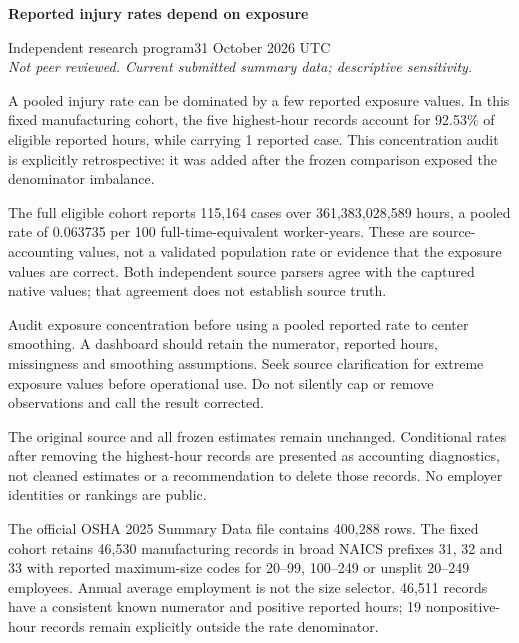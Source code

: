 \documentclass[11pt,letterpaper]{article}
\newcommand{\heading}[1]{\vspace{4pt}{\large\bfseries #1}\par}
\newcommand{\BoundA}{92.53}
\newcommand{\BoundB}{1}
\newcommand{\BoundC}{115,164}
\newcommand{\BoundD}{361,383,028,589}
\newcommand{\BoundE}{0.063735}
\newcommand{\BoundF}{400,288}
\newcommand{\BoundG}{46,530}
\newcommand{\BoundH}{46,511}
\newcommand{\BoundI}{19}
\begin{document}
{\LARGE\bfseries Reported injury rates depend on exposure\par}
\vspace{5pt}
Independent research program\hfill 31 October 2026 UTC\\
\textit{Not peer reviewed. Current submitted summary data; descriptive sensitivity.}

\heading{Practical finding}
A pooled injury rate can be dominated by a few reported exposure values. In this fixed manufacturing cohort, the five highest-hour records account for \BoundA{}\% of eligible reported hours, while carrying \BoundB{} reported case. This concentration audit is explicitly retrospective: it was added after the frozen comparison exposed the denominator imbalance.

The full eligible cohort reports \BoundC{} cases over \BoundD{} hours, a pooled rate of \BoundE{} per 100 full-time-equivalent worker-years. These are source-accounting values, not a validated population rate or evidence that the exposure values are correct. Both independent source parsers agree with the captured native values; that agreement does not establish source truth.

\heading{Recommended use}
Audit exposure concentration before using a pooled reported rate to center smoothing. A dashboard should retain the numerator, reported hours, missingness and smoothing assumptions. Seek source clarification for extreme exposure values before operational use. Do not silently cap or remove observations and call the result corrected.

The original source and all frozen estimates remain unchanged. Conditional rates after removing the highest-hour records are presented as accounting diagnostics, not cleaned estimates or a recommendation to delete those records. No employer identities or rankings are public.

\heading{Source and fixed scope}
The official OSHA 2025 Summary Data file contains \BoundF{} rows. The fixed cohort retains \BoundG{} manufacturing records in broad NAICS prefixes 31, 32 and 33 with reported maximum-size codes for 20--99, 100--249 or unsplit 20--249 employees. Annual average employment is not the size selector. \BoundH{} records have a consistent known numerator and positive reported hours; \BoundI{} nonpositive-hour records remain explicitly outside the rate denominator.
\end{document}
